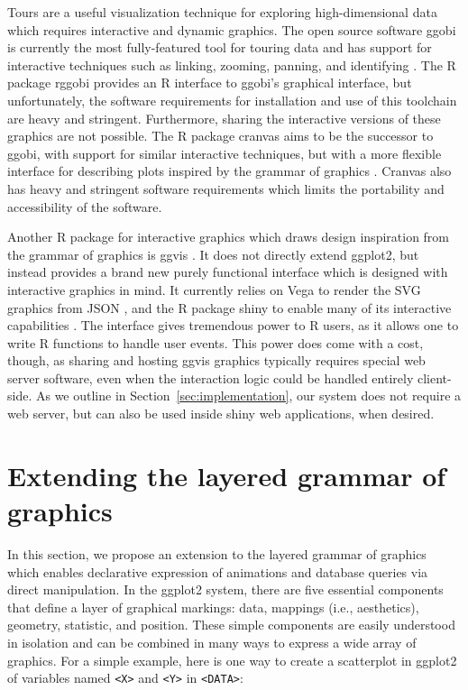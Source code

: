 \documentclass[12pt]{article}\usepackage[]{graphicx}\usepackage[]{color}
\begin{document}
Tours are a useful visualization technique for exploring high-dimensional data
which requires interactive and dynamic graphics. The open source software ggobi 
is currently the most fully-featured tool for touring data and has support
for interactive techniques such as linking, zooming, panning, and identifying 
\citep{ggobi:2007}. The R package rggobi \citep{rggobi} provides an R interface 
to ggobi's graphical interface, but unfortunately, the software requirements 
for installation and use of this toolchain are heavy and stringent. Furthermore,
sharing the interactive versions of these graphics are not possible. The R 
package cranvas aims to be the successor to ggobi, with support for similar
interactive techniques, but with a more flexible interface for describing 
plots inspired by the grammar of graphics \citep{cranvas}. Cranvas also has 
heavy and stringent software requirements which limits the portability and
accessibility of the software.

Another R package for interactive graphics which draws design inspiration from 
the grammar of graphics is ggvis \citep{ggvis}. It does not directly extend 
ggplot2, but instead provides a brand new purely functional interface which 
is designed with interactive graphics in mind. It currently relies on Vega to
render the SVG graphics from JSON \citep{vega}, and the R package shiny to 
enable many of its interactive capabilities \citep{shiny}. The interface gives
tremendous power to R users, as it allows one to write R functions to handle 
user events. This power does come with a cost, though, as sharing and hosting 
ggvis graphics typically requires special web server software, even when the
interaction logic could be handled entirely client-side. As we outline in 
Section~\ref{sec:implementation}, our system does not require a web server, 
but can also be used inside shiny web applications, when desired.

\section{Extending the layered grammar of graphics}

In this section, we propose an extension to the layered grammar of graphics
\citep{ggplot2-paper} which enables declarative expression of animations and
database queries via direct manipulation. In the ggplot2 system, there are five
essential components that define a layer of graphical markings: data, mappings 
(i.e., aesthetics), geometry, statistic, and position. These simple components 
are easily understood in isolation and can be combined in many ways to express
a wide array of graphics. For a simple example, here is one way to create a
scatterplot in ggplot2 of variables named \texttt{<X>} and \texttt{<Y>} in 
\texttt{<DATA>}:
\end{document}

